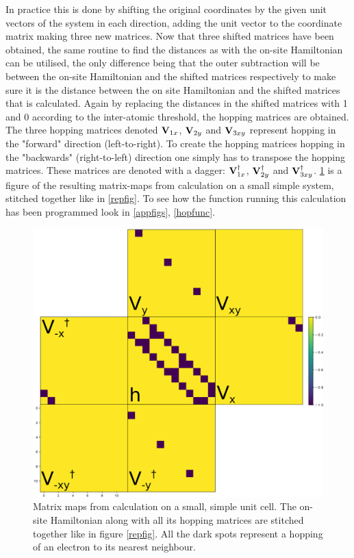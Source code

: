 In practice this is done by shifting the original coordinates by the given unit vectors of the system in each direction, adding the unit vector to the coordinate matrix making three new matrices. Now that three shifted matrices have been obtained, the same routine to find the distances as with the on-site Hamiltonian can be utilised, the only difference being that the outer subtraction will be between the on-site Hamiltonian and the shifted matrices respectively to make sure it is the distance between the on site Hamiltonian and the shifted matrices that is calculated. Again by replacing the distances in the shifted matrices with 1 and 0 according to the inter-atomic threshold, the hopping matrices are obtained. The three hopping matrices denoted \(\vb{V}_{1x}\), \(\vb{V}_{2y}\) and \(\vb{V}_{3xy}\) represent hopping in the "forward" direction (left-to-right). To create the hopping matrices hopping in the "backwards" (right-to-left) direction one simply has to transpose the hopping matrices. These matrices are denoted with a dagger: \(\vb{V}_{1x}^{\dagger}\), \(\vb{V}_{2y}^{\dagger}\) and \(\vb{V}_{3xy}^{\dagger}\). \cref{matrixmap} is a figure of the resulting matrix-maps from calculation on a small simple system, stitched together like in \cref{repfig}. To see how the function running this calculation has been programmed look in \cref{appfigs}, \cref{hopfunc}. 
\begin{figure}[H]
	\centering
	\includegraphics[width=\textwidth]{Figures/stitch.eps}
	\caption{Matrix maps from calculation on a small, simple unit cell. The on-site Hamiltonian along with all its hopping matrices are stitched together like in figure \cref{repfig}. All the dark spots represent a hopping of an electron to its nearest neighbour.}
	\label{matrixmap}
\end{figure}
